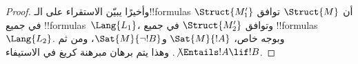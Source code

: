 \documentclass[../../../include/open-logic-section]{subfiles}
\begin{document}
\begin{proof}
وأخيرًا يبيّن الاستقراء على الـ!!{formula}s أن $\Struct{M}$ توافق
$\Struct{M'_1}$ في جميع !!{formula}s~$\Lang{L_1}$، وتوافق
$\Struct{M'_2}$ في جميع !!{formula}s~$\Lang{L_2}$. وبوجه خاص،
$\Sat{M}{!A}$ و$\Sat{M}{\lnot!B}$، ومن ثم
$\not\Entails !A \lif !B$. وهذا يتم برهان مبرهنة كريغ في الاستيفاء.
\end{proof}
\end{document}
